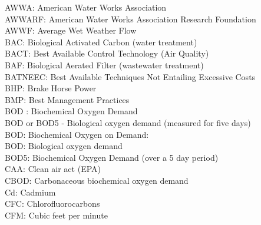 \documentclass{article}
\begin{document}
AWWA:  American Water Works Association
\vspace{0.3cm}\\
AWWARF:  American Water Works Association Research Foundation
\vspace{0.3cm}\\
AWWF:  Average Wet Weather Flow
\vspace{0.3cm}\\
BAC:  Biological Activated Carbon (water treatment)
\vspace{0.3cm}\\
BACT:  Best Available Control Technology (Air Quality)
\vspace{0.3cm}\\
BAF:  Biological Aerated Filter (wastewater treatment)
\vspace{0.3cm}\\
BATNEEC:  Best Available Techniques Not Entailing Excessive Costs
\vspace{0.3cm}\\
BHP:  Brake Horse Power
\vspace{0.3cm}\\
BMP:  Best Management Practices
\vspace{0.3cm}\\
BOD :  Biochemical Oxygen Demand
\vspace{0.3cm}\\
BOD or BOD5 - Biological oxygen demand (measured for five days)
\vspace{0.3cm}\\
BOD:  Biochemical Oxygen on Demand:  
\vspace{0.3cm}\\
BOD:  Biological oxygen demand
\vspace{0.3cm}\\
BOD5:  Biochemical Oxygen Demand (over a 5 day period)
\vspace{0.3cm}\\
CAA:  Clean air act (EPA)
\vspace{0.3cm}\\
CBOD:  Carbonaceous biochemical oxygen demand 
\vspace{0.3cm}\\
Cd:  Cadmium
\vspace{0.3cm}\\
CFC:  Chlorofluorocarbons
\vspace{0.3cm}\\
CFM:  Cubic feet per minute
\vspace{0.3cm}\\
\end{document}
